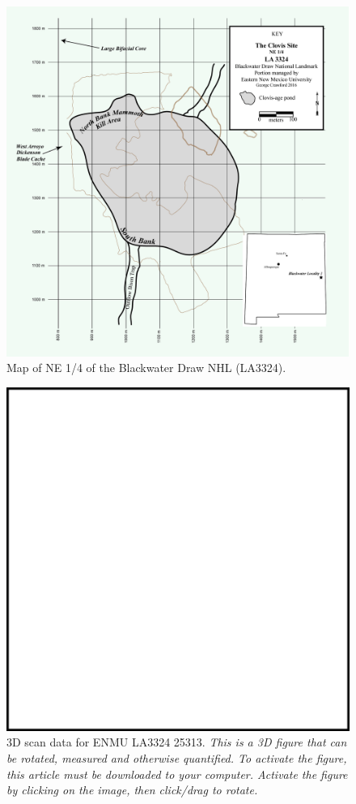 \documentclass[preprint,12pt]{elsarticle}
\begin{document}
\begin{figure}[ht]\centering
\includegraphics[width=\linewidth]{Fig1}
\caption{Map of NE 1/4 of the Blackwater Draw NHL (LA3324).}
\label{fig:Fig1}
\end{figure}

\begin{figure}[ht]\centering
\includegraphics[width=\linewidth]{Fig2}
\caption{3D scan data for ENMU LA3324 25313. \em This is a 3D figure that can be rotated, measured and otherwise quantified. To activate the figure, this article must be downloaded to your computer. Activate the figure by clicking on the image, then click/drag to rotate.}
\label{fig:Fig2}
\end{figure}
\end{document}
